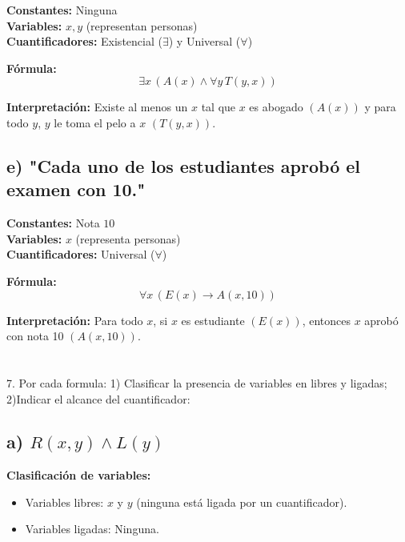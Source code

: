 \documentclass[11pt,letterpaper]{article}
\begin{document}
\textbf{Constantes:} Ninguna \\
\textbf{Variables:} \( x, y \) (representan personas) \\
\textbf{Cuantificadores:} Existencial (\( \exists \)) y Universal (\( \forall \))

\textbf{Fórmula:}
\[
\exists x \, (A(x) \land \forall y \, T(y, x))
\]

\textbf{Interpretación:} Existe al menos un \( x \) tal que \( x \) es abogado \( (A(x)) \) y para todo \( y \), \( y \) le toma el pelo a \( x \) \( (T(y, x)) \).

\subsection*{e) "Cada uno de los estudiantes aprobó el examen con 10."}

\textbf{Constantes:} Nota \( 10 \) \\
\textbf{Variables:} \( x \) (representa personas) \\
\textbf{Cuantificadores:} Universal (\( \forall \))

\textbf{Fórmula:}
\[
\forall x \, (E(x) \rightarrow A(x, 10))
\]

\textbf{Interpretación:} Para todo \( x \), si \( x \) es estudiante \( (E(x)) \), entonces \( x \) aprobó con nota 10 \( (A(x, 10)) \).













\section{}7. Por cada formula: 1) Clasificar la presencia de variables en libres y ligadas; 2)Indicar el alcance del cuantificador:

\subsection*{a) \( R(x, y) \land L(y) \)}

\textbf{Clasificación de variables:}
\begin{itemize}
    \item Variables libres: \( x \) y \( y \) (ninguna está ligada por un cuantificador).
    \item Variables ligadas: Ninguna.
\end{itemize}
\end{document}
